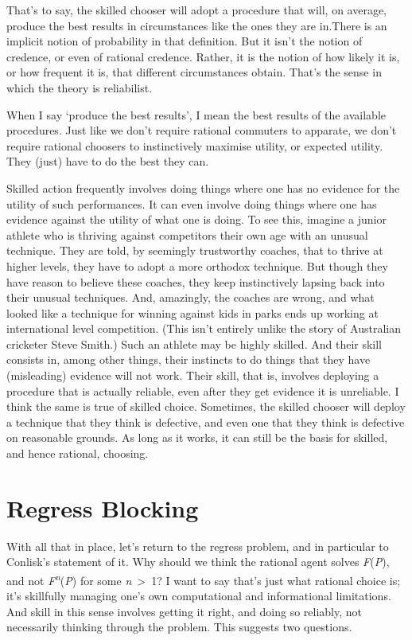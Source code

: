 \documentclass[
  10pt,
  letterpaper,
  DIV=11,
  numbers=noendperiod,
  twoside]{scrartcl}
\begin{document}
That's to say, the skilled chooser will adopt a procedure that will, on
average, produce the best results in circumstances like the ones they
are in.There is an implicit notion of probability in that definition.
But it isn't the notion of credence, or even of rational credence.
Rather, it is the notion of how likely it is, or how frequent it is,
that different circumstances obtain. That's the sense in which the
theory is reliabilist.

When I say `produce the best results', I mean the best results of the
available procedures. Just like we don't require rational commuters to
apparate, we don't require rational choosers to instinctively maximise
utility, or expected utility. They (just) have to do the best they can.

Skilled action frequently involves doing things where one has no
evidence for the utility of such performances. It can even involve doing
things where one has evidence against the utility of what one is doing.
To see this, imagine a junior athlete who is thriving against
competitors their own age with an unusual technique. They are told, by
seemingly trustworthy coaches, that to thrive at higher levels, they
have to adopt a more orthodox technique. But though they have reason to
believe these coaches, they keep instinctively lapsing back into their
unusual techniques. And, amazingly, the coaches are wrong, and what
looked like a technique for winning against kids in parks ends up
working at international level competition. (This isn't entirely unlike
the story of Australian cricketer Steve Smith.) Such an athlete may be
highly skilled. And their skill consists in, among other things, their
instincts to do things that they have (misleading) evidence will not
work. Their skill, that is, involves deploying a procedure that is
actually reliable, even after they get evidence it is unreliable. I
think the same is true of skilled choice. Sometimes, the skilled chooser
will deploy a technique that they think is defective, and even one that
they think is defective on reasonable grounds. As long as it works, it
can still be the basis for skilled, and hence rational, choosing.

\section{Regress Blocking}\label{regress-blocking}

With all that in place, let's return to the regress problem, and in
particular to Conlisk's statement of it. Why should we think the
rational agent solves \emph{F}(\emph{P}), and not
\emph{F\textsuperscript{n}}(\emph{P}) for some \emph{n}~\textgreater~1?
I want to say that's just what rational choice is; it's skillfully
managing one's own computational and informational limitations. And
skill in this sense involves getting it right, and doing so reliably,
not necessarily thinking through the problem. This suggests two
questions.
\end{document}
